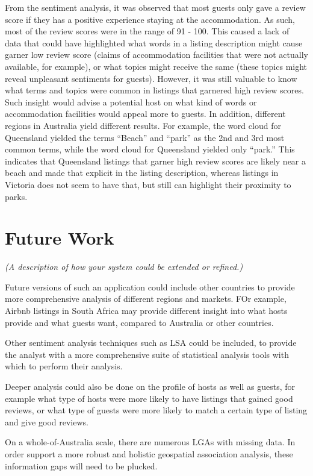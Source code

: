\documentclass{acm_proc_article-sp}
\begin{document}
From the sentiment analysis, it was observed that most guests only gave
a review score if they has a positive experience staying at the
accommodation. As such, most of the review scores were in the range of
91 - 100. This caused a lack of data that could have highlighted what
words in a listing description might cause garner low review score
(claims of accommodation facilities that were not actually available,
for example), or what topics might receive the same (these topics might
reveal unpleasant sentiments for guests). However, it was still valuable
to know what terms and topics were common in listings that garnered high
review scores. Such insight would advise a potential host on what kind
of words or accommodation facilities would appeal more to guests. In
addition, different regions in Australia yield different results. For
example, the word cloud for Queensland yielded the terms ``Beach'' and
``park'' as the 2nd and 3rd most common terms, while the word cloud for
Queensland yielded only ``park.'' This indicates that Queensland
listings that garner high review scores are likely near a beach and made
that explicit in the listing description, whereas listings in Victoria
does not seem to have that, but still can highlight their proximity to
parks.

\hypertarget{future-work}{%
\section{Future Work}\label{future-work}}

\emph{(A description of how your system could be extended or refined.)}

Future versions of such an application could include other countries to
provide more comprehensive analysis of different regions and markets.
FOr example, Airbnb listings in South Africa may provide different
insight into what hosts provide and what guests want, compared to
Australia or other countries.

Other sentiment analysis techniques such as LSA could be included, to
provide the analyst with a more comprehensive suite of statistical
analysis tools with which to perform their analysis.

Deeper analysis could also be done on the profile of hosts as well as
guests, for example what type of hosts were more likely to have listings
that gained good reviews, or what type of guests were more likely to
match a certain type of listing and give good reviews.

On a whole-of-Australia scale, there are numerous LGAs with missing
data. In order support a more robust and holistic geospatial association
analysis, these information gaps will need to be plucked.
\end{document}
